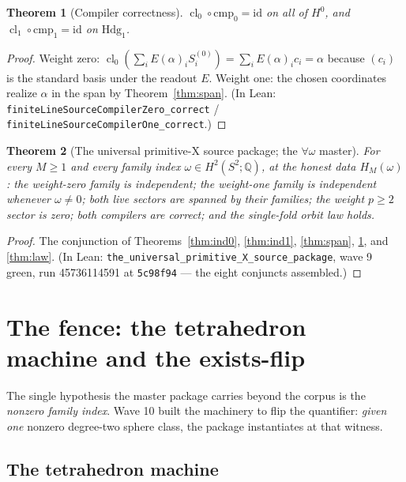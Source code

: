 \documentclass[11pt,a4paper]{article}
\theoremstyle{plain}
\newtheorem{theorem}{Theorem}[section]
\theoremstyle{definition}
\newcommand{\Q}{\mathbb{Q}}
\newcommand{\cl}{\operatorname{cl}}
\begin{document}
\begin{theorem}[Compiler correctness]
\label{thm:compilers}
$\cl_0 \circ \mathrm{cmp}_0 = \mathrm{id}$ on all of $H^0$, and
$\cl_1 \circ \mathrm{cmp}_1 = \mathrm{id}$ on
$\mathrm{Hdg}_1$.
\end{theorem}

\begin{proof}
Weight zero: $\cl_0(\sum_i E(\alpha)_i S^{(0)}_i) = \sum_i
E(\alpha)_i c_i = \alpha$ because $(c_i)$ is the standard basis
under the readout $E$.  Weight one: the chosen coordinates realize
$\alpha$ in the span by Theorem~\ref{thm:span}.  (In Lean:
\texttt{finiteLineSourceCompilerZero\_correct} /
\texttt{finiteLineSourceCompilerOne\_correct}.)
\end{proof}

\begin{theorem}[The universal primitive-X source package; the
$\forall\omega$ master]\label{thm:master}
For every $M \ge 1$ and every family index $\omega \in H^2(S^2;\Q)$,
at the honest data $H_M(\omega)$: the weight-zero family is
independent; the weight-one family is independent whenever $\omega
\ne 0$; both live sectors are spanned by their families; the weight
$p \ge 2$ sector is zero; both compilers are correct; and the
single-fold orbit law holds.
\end{theorem}

\begin{proof}
The conjunction of Theorems~\ref{thm:ind0}, \ref{thm:ind1},
\ref{thm:span}, \ref{thm:compilers}, and \ref{thm:law}.  (In Lean:
\texttt{the\_universal\_primitive\_X\_source\_package}, wave 9
green, run 45736114591 at \texttt{5c98f94} --- the eight conjuncts
assembled.)
\end{proof}

\section{The fence: the tetrahedron machine and the exists-flip}
\label{sec:fence}

The single hypothesis the master package carries beyond the corpus is
the \emph{nonzero family index}.  Wave 10 built the machinery to flip
the quantifier: \emph{given one} nonzero degree-two sphere class, the
package instantiates at that witness.

\subsection{The tetrahedron machine}
\end{document}
